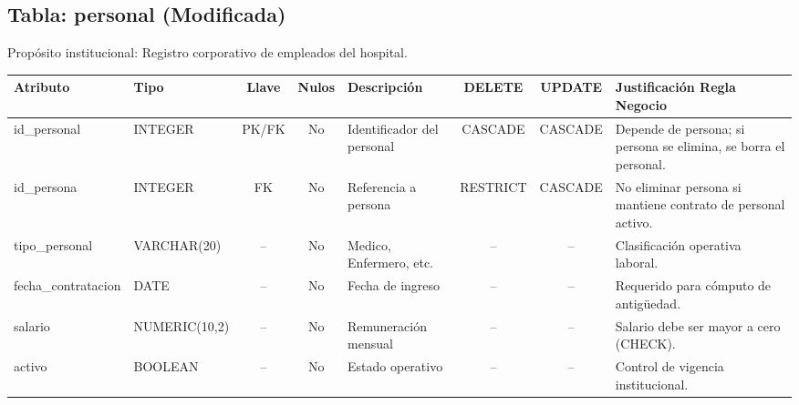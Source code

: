 \documentclass[11pt,a4paper]{article}
\begin{document}
\subsection{Tabla: personal (Modificada)}
Propósito institucional: Registro corporativo de empleados del hospital.
\begin{table}[H]
\centering
\scriptsize
\begin{tabularx}{\linewidth}{|l|l|c|c|X|c|c|X|}
\hline
\textbf{Atributo} & \textbf{Tipo} & \textbf{Llave} & \textbf{Nulos} & \textbf{Descripción} & \textbf{DELETE} & \textbf{UPDATE} & \textbf{Justificación Regla Negocio} \\
\hline
id\_personal & INTEGER & PK/FK & No & Identificador del personal & CASCADE & CASCADE & Depende de persona; si persona se elimina, se borra el personal. \\
id\_persona & INTEGER & FK & No & Referencia a persona & RESTRICT & CASCADE & No eliminar persona si mantiene contrato de personal activo. \\
tipo\_personal & VARCHAR(20) & -- & No & Medico, Enfermero, etc. & -- & -- & Clasificación operativa laboral. \\
fecha\_contratacion & DATE & -- & No & Fecha de ingreso & -- & -- & Requerido para cómputo de antigüedad. \\
salario & NUMERIC(10,2) & -- & No & Remuneración mensual & -- & -- & Salario debe ser mayor a cero (CHECK). \\
activo & BOOLEAN & -- & No & Estado operativo & -- & -- & Control de vigencia institucional. \\
\hline
\end{tabularx}
\end{table}
\end{document}
